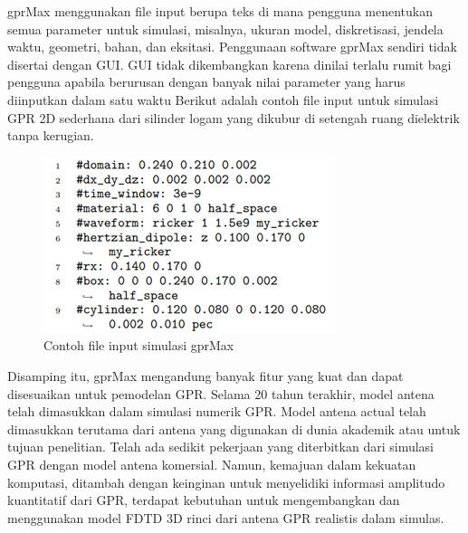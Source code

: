 gprMax menggunakan file input berupa teks di mana pengguna menentukan semua parameter untuk simulasi, misalnya, ukuran model, diskretisasi, jendela waktu, geometri, bahan, dan eksitasi. Penggunaan software gprMax sendiri tidak disertai dengan GUI. GUI tidak dikembangkan karena dinilai terlalu rumit bagi pengguna apabila berurusan dengan banyak nilai parameter yang harus diinputkan dalam satu waktu Berikut adalah contoh file input untuk simulasi GPR 2D sederhana dari silinder logam yang dikubur di setengah ruang dielektrik tanpa kerugian\parencite{Craig2016}.
\begin{figure} [H] \centering
  \includegraphics[scale=1]{gambar/bab2/gprmax1.png}
  \caption{Contoh file input simulasi gprMax \parencite{Craig2016}}
  \label{fig:gprMaxSim}
\end{figure}
Disamping itu, gprMax mengandung banyak fitur yang kuat dan dapat disesuaikan untuk pemodelan GPR. Selama 20 tahun terakhir, model antena telah dimasukkan dalam simulasi numerik GPR. Model antena actual telah dimasukkan terutama dari antena yang digunakan di dunia akademik atau untuk tujuan penelitian. Telah ada sedikit pekerjaan yang diterbitkan dari simulasi GPR dengan model antena komersial. Namun, kemajuan dalam kekuatan komputasi, ditambah dengan keinginan untuk menyelidiki informasi amplitudo kuantitatif dari GPR, terdapat kebutuhan untuk mengembangkan dan menggunakan model FDTD 3D rinci dari antena GPR realistis dalam simulas\parencite{Craig2016}.

